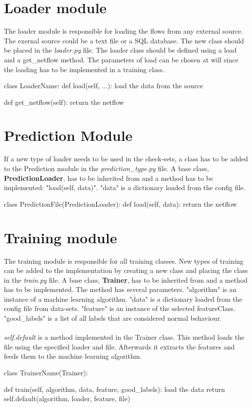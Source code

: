 \section{Loader module}
The loader module is responsible for loading the flows from any external source. The exernal source could be a text file or a SQL database. The new class should be placed in the \textit{loader.py} file. The loader class should be defined using a load and a get\_netflow method. The parameters of load can be chosen at will since the loading has to be implemented in a training class. \\
\begin{python}
class LoaderName:
    def load(self, ...):
        load the data from the source
        
    def get_netflow(self):
        return the netflow
\end{python}

\section{Prediction Module}
\noindent If a new type of loader needs to be used in the check-sets, a class has to be added to the Prediction module in the \textit{prediction\_type.py} file.  A base class, \textbf{PredictionLoader}, has to be inherited from and a method has to be implemented: "load(self, data)". "data" is a dictionary loaded from the config file.\\
\begin{python}
class PredictionFile(PredictionLoader):
    def load(self, data):
        return the netflow
\end{python}

\section{Training module}
The training module is responsible for all training classes. New types of training can be added to the implementation by creating a new class and placing the class in the \textit{train.py} file. A base class, \textbf{Trainer}, has to be inherited from and a method has to be implemented. The method has several parameters. "algorithm" is an instance of a machine learning algorithm. "data" is a dictionary loaded from the config file from data-sets. "feature" is an instance of the selected featureClass. "good\_labels" is a list of all labels that are considered normal behaviour. \\
\\
\textit{self.default} is a method implemented in the Trainer class. This method loads the file using the specified loader and file. Afterwards it extracts the features and feeds them to the machine learning algorithm. \\
\begin{python}
class TrainerName(Trainer):

    def train(self, algorithm, data, feature, 
                                  good_labels):
        load the data
        return self.default(algorithm, loader, 
                                    feature, file)
\end{python}

